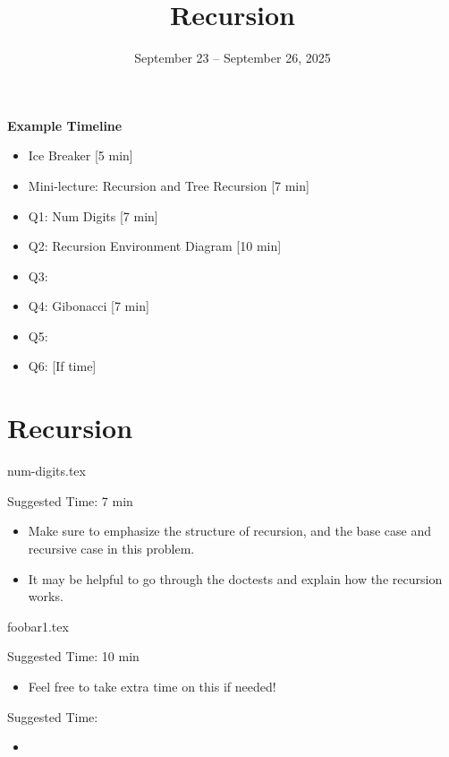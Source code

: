\documentclass{exam}
\title{Recursion}
\date{September 23 -- September 26, 2025}
\begin{document}
\maketitle

\begin{meta}
    \textbf{Example Timeline}
    \begin{itemize}
        \item Ice Breaker [5 min]
        \item Mini-lecture: Recursion and Tree Recursion [7 min]
        \item Q1: Num Digits [7 min]
        \item Q2: Recursion Environment Diagram [10 min]
        \item Q3: 
        \item Q4: Gibonacci [7 min]
        \item Q5: 
        \item Q6: [If time]
    \end{itemize}

\end{meta}

\section{Recursion}
\begin{questions}
    {num-digits.tex}
    \begin{questionmeta}
        Suggested Time: 7 min
        \begin{itemize}
            \item Make sure to emphasize the structure of recursion, and the base case and recursive case in this problem.
            \item It may be helpful to go through the doctests and explain how the recursion works.
        \end{itemize}
    \end{questionmeta}

    {foobar1.tex}
    \begin{questionmeta}
        Suggested Time: 10 min
        \begin{itemize}
            \item Feel free to take extra time on this if needed!
        \end{itemize}
    \end{questionmeta}


{}
    \begin{questionmeta}
        Suggested Time: 
        \begin{itemize}
            \item 
        \end{itemize}
    \end{questionmeta}
\end{questions}
\end{document}
